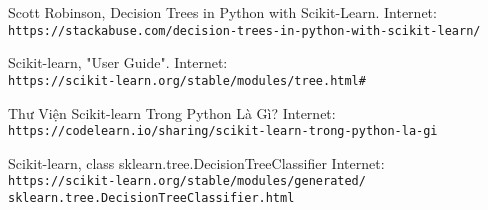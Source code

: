\begin{thebibliography}{99}

Scott Robinson, Decision Trees in Python with Scikit-Learn.
Internet:\\
\texttt{https://stackabuse.com/decision-trees-in-python-with-scikit-learn/}

Scikit-learn, "User Guide".
Internet:\\
\texttt{https://scikit-learn.org/stable/modules/tree.html\#}

Thư Viện Scikit-learn Trong Python Là Gì?
Internet:\\
\texttt{https://codelearn.io/sharing/scikit-learn-trong-python-la-gi}

Scikit-learn, class sklearn.tree.DecisionTreeClassifier
Internet:\\
\texttt{https://scikit-learn.org/stable/modules/generated/\\
sklearn.tree.DecisionTreeClassifier.html}

\end{thebibliography}
